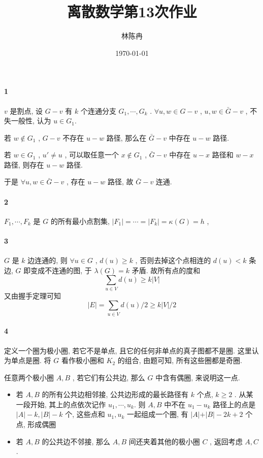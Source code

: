 \documentclass[a4paper, UTF8]{ctexart}				%
\title{离散数学第13次作业}
\author{林陈冉}
\date{\today}
\numberwithin{equation}{section}				%
\begin{document}
    \maketitle										%
    \paragraph{1}\quad 
        $v$ 是割点, 设 $G - v$ 有 $k$ 个连通分支 $G_1, \cdots , G_k$ .
        $\forall u, w \in G - v$ , $u, w \in \bar{G} - v$ , 不失一般性, 认为 $u \in G_1$.
        
        若 $w \notin G_1$ , $G - v$ 不存在 $u-w$ 路径, 那么在 $\bar{G} - v$ 中存在 $u-w$ 路径.

        若 $w \in G_1$ , $u' \ne u$ , 可以取任意一个 $x \notin G_1$ ,
        $\bar{G} - v$ 中存在 $u-x$ 路径和 $w-x$ 路径, 则存在 $u-w$ 路径.

        于是 $\forall u, w \in \bar{G} - v$ , 存在 $u-w$ 路径, 故 $\bar{G} - v$ 连通.
    \paragraph{2}\quad 
        $F_1, \cdots, F_k$ 是 $G$ 的所有最小点割集,
        $\vert{F_1}\vert = \cdots = \vert{F_k}\vert = \kappa(G) = h$ ,
        
    \paragraph{3}\quad 
        $G$ 是 $k$ 边连通的, 则 $\forall u \in G$ , $d(u) \geq k$ ,
        否则去掉这个点相连的 $d(u) < k$ 条边, $G$ 即变成不连通的图, 于 $\lambda(G) = k$ 矛盾.
        故所有点的度和 $$\sum_{u \in V} d(u) \geq k \vert{V}\vert$$
        又由握手定理可知 $$\vert{E}\vert = \sum_{u \in V} d(u) / 2 \geq k \vert{V}\vert / 2$$
    \paragraph{4}\quad 
        定义一个圈为极小圈, 若它不是单点, 且它的任何非单点的真子图都不是圈. 这里认为单点是圈. 
        将 $G$ 看作极小圈和 $K_2$ 的组合, 由题可知, 所有这些圈都是奇圈.

        任意两个极小圈 $A , B$ , 若它们有公共边, 那么 $G$ 中含有偶圈, 来说明这一点.
        \begin{itemize}
            \item 若 $A, B$ 的所有公共边相邻接, 公共边形成的最长路径有 $k$ 个点, $k \geq 2$ .
            从某一段开始, 其上的点依次记作 $u_1, \cdots, u_k$.
            则 $A, B$ 中不在 $u_1-u_k$ 路径上的点是 $\vert{A}\vert -k , \vert{B}\vert-k $ 个, 这些点和 $u_1, u_k$ 一起组成一个圈, 有 $\vert{A}\vert + \vert{B}\vert - 2k + 2$ 个点, 形成偶圈
            \item 若 $A, B$ 的公共边不邻接, 那么 $A, B$ 间还夹着其他的极小圈 $C$ , 返回考虑 $A, C$ .
        \end{itemize} 
\end{document}
